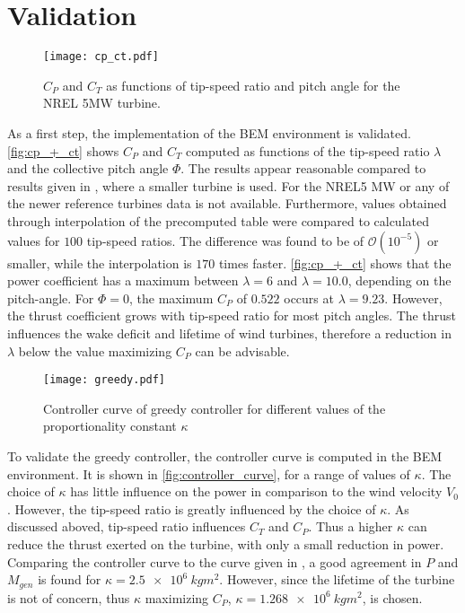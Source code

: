 \section{Validation}
\begin{figure}[h]
	\centering
	\texttt{[image: cp\_ct.pdf]}
	\caption{$C_P$ and $C_T$ as functions of tip-speed ratio and pitch angle for the NREL 5MW turbine.}
	\label{fig:cp_+_ct}
\end{figure}
As a first step, the implementation of the BEM environment is validated. \autoref{fig:cp_+_ct} shows $C_P$ and $C_T$ computed as functions of the tip-speed ratio $\lambda$ and the collective pitch angle $\Phi$. The results appear reasonable compared to results given in \cite{hansen_aerodynamics_2008}, where a smaller turbine is used. For the NREL5 MW or any of the newer reference turbines data is not available. Furthermore, values obtained through interpolation of the precomputed table were compared to calculated values for $100$ tip-speed ratios. The difference was found to be of $\mathcal{O}\left(10^{-5}\right)$ or smaller, while the interpolation is $170$ times faster. \autoref{fig:cp_+_ct} shows that the power coefficient has a maximum between $\lambda=6$ and $\lambda=10.0$, depending on the pitch-angle. For $\Phi=0$, the maximum $C_P$ of $0.522$ occurs at $\lambda=9.23$. However, the thrust coefficient grows with tip-speed ratio for most pitch angles. The thrust influences the wake deficit and lifetime of wind turbines, therefore a reduction in $\lambda$ below the value maximizing $C_P$ can be advisable.\\
\begin{figure}[h]
	\centering
	\texttt{[image: greedy.pdf]}
	\caption{Controller curve of greedy controller for different values of the proportionality constant $\kappa$}
	\label{fig:controller_curve}
\end{figure}
To validate the greedy controller, the controller curve is computed in the BEM environment. It is shown in \autoref{fig:controller_curve}, for a range of values of $\kappa$. The choice of $\kappa$ has little influence on the power in comparison to the wind velocity $V_0$. However, the tip-speed ratio is greatly influenced by the choice of $\kappa$. As discussed aboved, tip-speed ratio influences $C_T$ and $C_P$. Thus a higher $\kappa$ can reduce the thrust exerted on the turbine, with only a small reduction in power. Comparing the controller curve to the curve given in \cite{jonkman_definition_2009}, a good agreement in $P$ and $M_{gen}$ is found for $\kappa=\SI{2.5e6}{kgm^2}$. However, since the lifetime of the turbine is not of concern, thus $\kappa$ maximizing $C_P$,  $\kappa = \SI{1.268e6}{kgm^2}$, is chosen. \\
